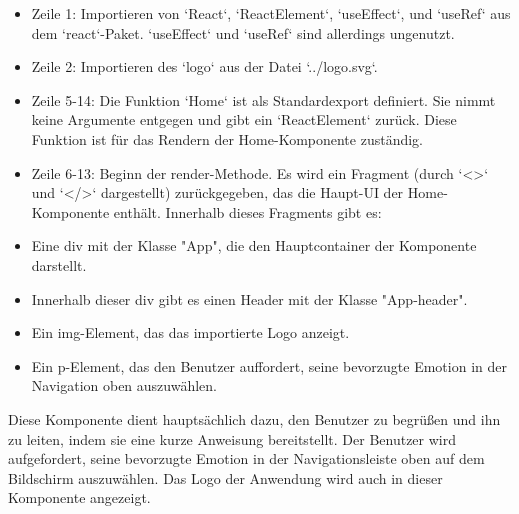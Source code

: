 \documentclass[./dokumentation.tex]{subfiles}
\begin{document}
\begin{itemize}
    \item Zeile 1: Importieren von `React`, `ReactElement`, `useEffect`, und `useRef` aus dem `react`-Paket. `useEffect` und `useRef` sind allerdings ungenutzt. \\
    \item Zeile 2: Importieren des `logo` aus der Datei `../logo.svg`. \\
    \item Zeile 5-14: Die Funktion `Home` ist als Standardexport definiert. Sie nimmt keine Argumente entgegen und gibt ein `ReactElement` zurück. Diese Funktion ist für das Rendern der Home-Komponente zuständig. \\
    \item Zeile 6-13: Beginn der render-Methode. Es wird ein Fragment (durch `<>` und `</>` dargestellt) zurückgegeben, das die Haupt-UI der Home-Komponente enthält. Innerhalb dieses Fragments gibt es: \\
    \item Eine div mit der Klasse "App", die den Hauptcontainer der Komponente darstellt. \\
    \item Innerhalb dieser div gibt es einen Header mit der Klasse "App-header".  \\
    \item Ein img-Element, das das importierte Logo anzeigt. \\
    \item Ein p-Element, das den Benutzer auffordert, seine bevorzugte Emotion in der Navigation oben auszuwählen.\\
\end{itemize}

Diese Komponente dient hauptsächlich dazu, den Benutzer zu begrüßen und ihn zu leiten, indem sie eine kurze Anweisung bereitstellt. Der Benutzer wird aufgefordert, seine bevorzugte Emotion in der Navigationsleiste oben auf dem Bildschirm auszuwählen. Das Logo der Anwendung wird auch in dieser Komponente angezeigt.
\end{document}
